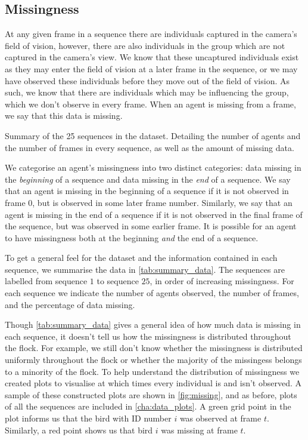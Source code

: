 \subsection{Missingness}
\label{ssec:missingness}

At any given frame in a sequence there are individuals captured in the camera's field of vision, 
however, there are also individuals in the group which are not captured in the camera's view. We know 
that these uncaptured individuals exist as they may enter the field of vision at a later frame in the 
sequence, or we may have observed these individuals before they move out of the field of vision. As 
such, we know that there are individuals which may be influencing the group, which we don't observe 
in every frame. When an agent is missing from a frame, we say that this data is missing.

\begin{table}[!tbp]
	
		\caption{Summary of the 25 sequences in the dataset. Detailing the number of agents and the number
of frames in every sequence, as well as the amount of missing data.}
	\label{tab:summary_data}
\end{table}

We categorise an agent's missingness into two distinct categories: data missing in the 
\emph{beginning} of a sequence and data missing in the \emph{end} of a sequence. We say that an agent 
is missing in the beginning of a sequence if it is not observed in frame $0$, but is observed in some 
later frame number. Similarly, we say that an agent is missing in the end of a sequence if it is not 
observed in the final frame of the sequence, but was observed in some earlier frame. It is possible 
for an agent to have missingness both at the beginning \emph{and} the end of a sequence.

To get a general feel for the dataset and the information contained in each sequence, we summarise 
the data in \cref{tab:summary_data}. The sequences are labelled from sequence $1$ to sequence $25$, 
in order of increasing missingness. For each sequence we indicate the number of agents observed, the 
number of frames, and the percentage of data missing.

Though \cref{tab:summary_data} gives a general idea of how much data is missing in each sequence, it 
doesn't tell us how the missingness is distributed throughout the flock. For example, we still don't 
know whether the missingness is distributed uniformly throughout the flock or whether the majority of 
the missingess belongs to a minority of the flock. To help understand the distribution of missingness 
we created plots to visualise at which times every individual is and isn't observed. A sample of 
these constructed plots are shown in \cref{fig:missing}, and as before, plots of all the sequences 
are included in \cref{cha:data_plots}. A green grid point in the plot informs us that the bird with 
ID number $i$ was observed at frame $t$. Similarly, a red point shows us that bird $i$ was missing at 
frame $t$.

